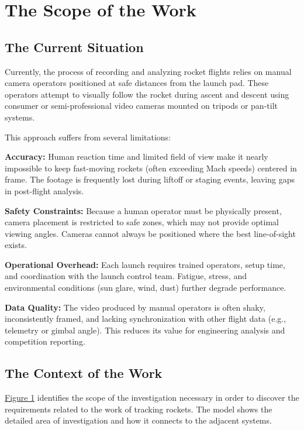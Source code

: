 \documentclass[12pt]{article}
\begin{document}
\section{The Scope of the Work}
\subsection{The Current Situation}

Currently, the process of recording and analyzing rocket flights relies on
manual camera operators positioned at safe distances from the launch pad. These
operators attempt to visually follow the rocket during ascent and descent using
consumer or semi-professional video cameras mounted on tripods or pan-tilt
systems.

This approach suffers from several limitations:

\textbf{Accuracy:} Human reaction time and limited field of view make it nearly
impossible to keep fast-moving rockets (often exceeding Mach speeds) centered
in frame. The footage is frequently lost during liftoff or staging events,
leaving gaps in post-flight analysis.

\textbf{Safety Constraints:} Because a human operator must be physically present, camera
placement is restricted to safe zones, which may not provide optimal viewing
angles. Cameras cannot always be positioned where the best line-of-sight
exists.

\textbf{Operational Overhead:} Each launch requires trained operators, setup time, and
coordination with the launch control team. Fatigue, stress, and environmental
conditions (sun glare, wind, dust) further degrade performance.

\textbf{Data Quality:} The video produced by manual operators is often shaky,
inconsistently framed, and lacking synchronization with other flight data
(e.g., telemetry or gimbal angle). This reduces its value for engineering
analysis and competition reporting.

\subsection{The Context of the Work}

\hyperref[img:context-of-work]{Figure 1} identifies the scope of the
investigation necessary in order to discover the requirements related to the
work of tracking rockets. The model shows the detailed area of investigation
and how it connects to the adjacent systems.
\end{document}
